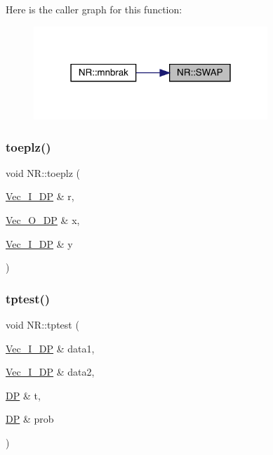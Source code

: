 Here is the caller graph for this function\+:
\nopagebreak
\begin{figure}[H]
\begin{center}
\leavevmode
\includegraphics[width=250pt]{da/d46/namespaceNR_af3d3d41b75c1e0ce80f32a6c45576db3_icgraph}
\end{center}
\end{figure}
\mbox{\label{namespaceNR_a708603e68ca30567cab74fb4141a67f1}} 
\subsubsection{\texorpdfstring{toeplz()}{toeplz()}}
{\footnotesize\ttfamily void N\+R\+::toeplz (\begin{DoxyParamCaption}\item[{\mbox{\hyperlink{namespaceNR_a9f943da53862537c552e2a770cb170ae}{Vec\+\_\+\+I\+\_\+\+DP}} \&}]{r,  }\item[{\mbox{\hyperlink{namespaceNR_a970094d23441f8ef6a45282a7eb2103d}{Vec\+\_\+\+O\+\_\+\+DP}} \&}]{x,  }\item[{\mbox{\hyperlink{namespaceNR_a9f943da53862537c552e2a770cb170ae}{Vec\+\_\+\+I\+\_\+\+DP}} \&}]{y }\end{DoxyParamCaption})}

\mbox{\label{namespaceNR_a12aa30fe12a4e3fe8fb89f946499954f}} 
\subsubsection{\texorpdfstring{tptest()}{tptest()}}
{\footnotesize\ttfamily void N\+R\+::tptest (\begin{DoxyParamCaption}\item[{\mbox{\hyperlink{namespaceNR_a9f943da53862537c552e2a770cb170ae}{Vec\+\_\+\+I\+\_\+\+DP}} \&}]{data1,  }\item[{\mbox{\hyperlink{namespaceNR_a9f943da53862537c552e2a770cb170ae}{Vec\+\_\+\+I\+\_\+\+DP}} \&}]{data2,  }\item[{\mbox{\hyperlink{namespaceNR_af6ff762dd605ff477b8e52387253a02a}{DP}} \&}]{t,  }\item[{\mbox{\hyperlink{namespaceNR_af6ff762dd605ff477b8e52387253a02a}{DP}} \&}]{prob }\end{DoxyParamCaption})}

